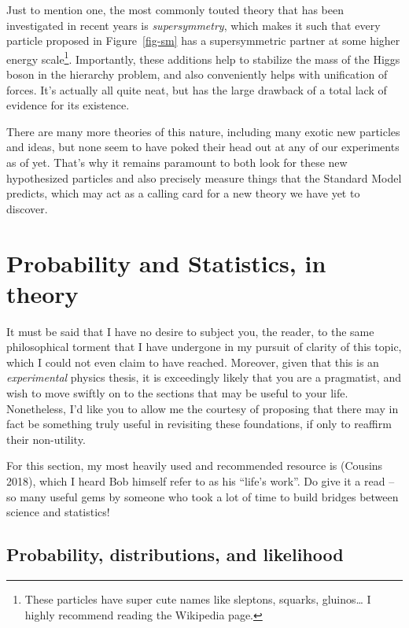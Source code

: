\documentclass[
  11pt,
  numbers=noendperiod]{book}
\begin{document}
Just to mention one, the most commonly touted theory that has been
investigated in recent years is \emph{supersymmetry}, which makes it
such that every particle proposed in Figure~\ref{fig-sm} has a
supersymmetric partner at some higher energy scale\footnote{These
  particles have super cute names like sleptons, squarks,
  gluinos\ldots{} I highly recommend reading the Wikipedia page.}.
Importantly, these additions help to stabilize the mass of the Higgs
boson in the hierarchy problem, and also conveniently helps with
unification of forces. It's actually all quite neat, but has the large
drawback of a total lack of evidence for its existence.

There are many more theories of this nature, including many exotic new
particles and ideas, but none seem to have poked their head out at any
of our experiments as of yet. That's why it remains paramount to both
look for these new hypothesized particles and also precisely measure
things that the Standard Model predicts, which may act as a calling card
for a new theory we have yet to discover.

\hypertarget{probability-and-statistics-in-theory}{%
\chapter{Probability and Statistics, in
theory}\label{probability-and-statistics-in-theory}}

It must be said that I have no desire to subject you, the reader, to the
same philosophical torment that I have undergone in my pursuit of
clarity of this topic, which I could not even claim to have reached.
Moreover, given that this is an \emph{experimental} physics thesis, it
is exceedingly likely that you are a pragmatist, and wish to move
swiftly on to the sections that may be useful to your life. Nonetheless,
I'd like you to allow me the courtesy of proposing that there may in
fact be something truly useful in revisiting these foundations, if only
to reaffirm their non-utility.

For this section, my most heavily used and recommended resource is
(Cousins 2018), which I heard Bob himself refer to as his ``life's
work''. Do give it a read -- so many useful gems by someone who took a
lot of time to build bridges between science and statistics!

\hypertarget{probability-distributions-and-likelihood}{%
\section{Probability, distributions, and
likelihood}\label{probability-distributions-and-likelihood}}
\end{document}

